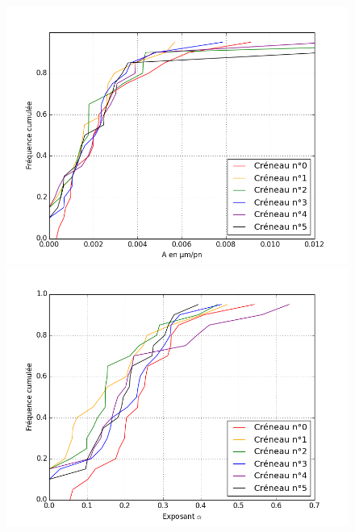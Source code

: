 \begin{figure}
\includegraphics[scale=0.3]{Figures/A_creneaux_S2.png} 
\includegraphics[scale=0.3]{Figures/E_creneaux_S2.png} 
\caption{\label{Evolution_6c}} 
\end{figure}

